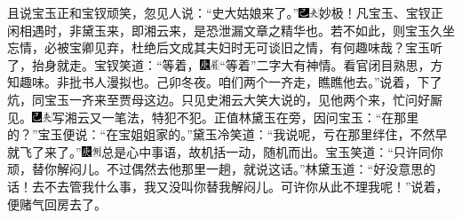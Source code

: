 且说宝玉正和宝钗顽笑，忽见人说：``史大姑娘来了。''{\includegraphics[width=3mm]{../Images/00003}\includegraphics[width=3mm]{../Images/00012}\footnotesize \kaishu 妙极！凡宝玉、宝钗正闲相遇时，非黛玉来，即湘云来，是恐泄漏文章之精华也。若不如此，则宝玉久坐忘情，必被宝卿见弃，杜绝后文成其夫妇时无可谈旧之情，有何趣味哉？}宝玉听了，抬身就走。宝钗笑道：``等着，{\includegraphics[width=3mm]{../Images/00004}\includegraphics[width=3mm]{../Images/00010}\footnotesize \kaishu ``等着''二字大有神情。看官闭目熟思，方知趣味。非批书人漫拟也。己卯冬夜。}咱们两个一齐走，瞧瞧他去。''说着，下了炕，同宝玉一齐来至贾母这边。只见史湘云大笑大说的，见他两个来，忙问好厮见。{\includegraphics[width=3mm]{../Images/00003}\includegraphics[width=3mm]{../Images/00012}\footnotesize \kaishu 写湘云又一笔法，特犯不犯。}正值林黛玉在旁，因问宝玉：``在那里的？''宝玉便说：``在宝姐姐家的。''黛玉冷笑道：``我说呢，亏在那里绊住，不然早就飞了来了。''{\includegraphics[width=3mm]{../Images/00004}\includegraphics[width=3mm]{../Images/00011}\footnotesize \kaishu 总是心中事语，故机括一动，随机而出。}宝玉笑道：``只许同你顽，替你解闷儿。不过偶然去他那里一趟，就说这话。''林黛玉道：``好没意思的话！去不去管我什么事，我又没叫你替我解闷儿。可许你从此不理我呢！''说着，便赌气回房去了。

